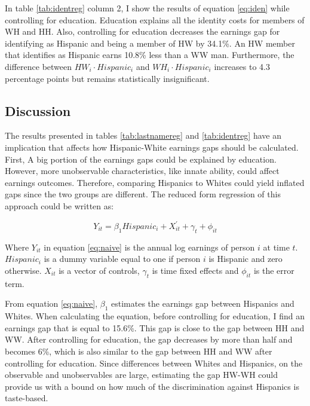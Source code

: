 \documentclass{wptemp}
\begin{document}
In table  \ref{tab:identreg} column 2, I show the results of equation \ref{eq:iden} while controlling for education. Education explains all the identity costs for members of WH and HH. Also, controlling for education decreases the earnings gap for identifying as Hispanic and being a member of HW by 34.1\%. An HW member that identifies as Hispanic earns 10.8\% less than a WW man. Furthermore, the difference between $HW_{i} \cdot Hispanic_{i}$  and $WH_{i} \cdot Hispanic_{i}$ increases to 4.3 percentage points but remains statistically insignificant.
\subsection{Discussion}
 
 The results presented in tables \ref{tab:lastnamereg} and \ref{tab:identreg} have an implication that affects how Hispanic-White earnings gaps should be calculated. First, A big portion of the earnings gaps could be explained by education. However, more unobservable characteristics, like innate ability, could affect earnings outcomes. Therefore, comparing Hispanics to Whites could yield inflated gaps since the two groups are different. The reduced form regression of this approach could be written as:
 
 \begin{equation} \label{eq:naive}
 Y_{it} = \beta_{1} Hispanic_{i} + X_{it}^{\prime} + \gamma_{t}+\phi_{it}
 \end{equation}
 
 Where $Y_{it}$ in equation \ref{eq:naive} is the annual log earnings of person $i$ at time $t$. $Hispanic_{i}$ is a dummy variable equal to one if person $i$ is Hispanic and zero otherwise. $X_{it}$ is a vector of controls, $\gamma_{t}$ is time fixed effects and $\phi_{it}$ is the error term.
 
 From equation \ref{eq:naive}, $\beta_{1}$ estimates the earnings gap between Hispanics and Whites. When calculating the equation, before controlling for education, I find an earnings gap that is equal to 15.6\%. This gap is close to the gap between HH and WW. After controlling for education, the gap decreases by more than half and becomes 6\%, which is also similar to the gap between HH and WW after controlling for education. Since differences between Whites and Hispanics, on the observable and unobservables are large, estimating the gap HW-WH could provide us with a bound on how much of the discrimination against Hispanics is taste-based. 
 
\end{document}
